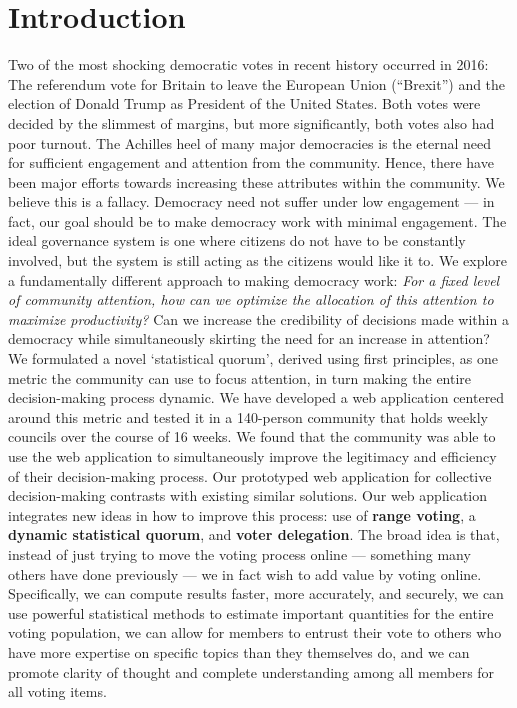\documentclass[format=acmsmall, review=true, screen=true, anonymous=true]{acmart}
\begin{document}
%
%


\maketitle

\renewcommand{\shortauthors}{M. Milutinovic et al.}

\section{Introduction}

Two of the most shocking democratic votes in recent history occurred in 2016: The referendum vote for Britain to leave the European Union (“Brexit”) and the election of Donald Trump as President of the United States. Both votes were decided by the slimmest of margins, but more significantly, both votes also had poor turnout. The Achilles heel of many major democracies is the eternal need for sufficient engagement and attention from the community. Hence, there have been major efforts towards increasing these attributes within the community. We believe this is a fallacy. Democracy need not suffer under low engagement — in fact, our goal should be to make democracy work with minimal engagement. The ideal governance system is one where citizens do not have to be constantly involved, but the system is still acting as the citizens would like it to.
We explore a fundamentally different approach to making democracy work: \textit{For a fixed level of community attention, how can we optimize the allocation of this attention to maximize productivity?} Can we increase the credibility of decisions made within a democracy while simultaneously skirting the need for an increase in attention? We formulated a novel ‘statistical quorum’, derived using first principles, as one metric the community can use to focus attention, in turn making the entire decision-making process dynamic. We have developed a web application centered around this metric and tested it in a 140-person community that holds weekly councils over the course of 16 weeks. We found that the community was able to use the web application to simultaneously improve the legitimacy and efficiency of their decision-making process.
Our prototyped web application for collective decision-making contrasts with existing similar solutions. Our web application integrates new ideas in how to improve this process: use of \textbf{range voting}, a \textbf{dynamic statistical quorum}, and \textbf{voter delegation}. The broad idea is that, instead of just trying to move the voting process online — something many others have done previously — we in fact wish to add value by voting online. Specifically, we can compute results faster, more accurately, and securely, we can use powerful statistical methods to estimate important quantities for the entire voting population, we can allow for members to entrust their vote to others who have more expertise on specific topics than they themselves do, and we can promote clarity of thought and complete understanding among all members for all voting items.
\end{document}
